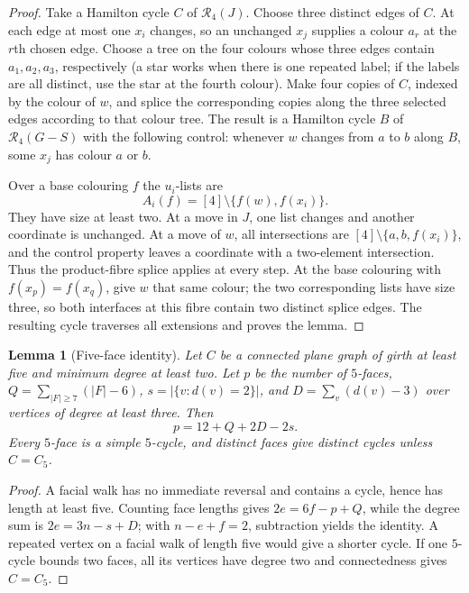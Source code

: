 \documentclass[11pt]{article}
\newtheorem{lemma}[theorem]{Lemma}
\theoremstyle{remark}
\newcommand{\R}{\mathcal R}
\numberwithin{equation}{section}
\numberwithin{table}{section}
\begin{document}
\begin{proof}
Take a Hamilton cycle $C$ of $\R_4(J)$.  Choose three distinct edges of
$C$.  At each edge at most one $x_i$ changes, so an unchanged $x_j$ supplies
a colour $a_r$ at the $r$th chosen edge.  Choose a tree on the four colours
whose three edges contain $a_1,a_2,a_3$, respectively (a star works when
there is one repeated label; if the labels are all distinct, use the star
at the fourth colour).  Make four copies of $C$, indexed by the colour of
$w$, and splice the corresponding copies along the three selected edges
according to that colour tree.  The result is a Hamilton cycle $B$ of
$\R_4(G-S)$ with the following control: whenever $w$ changes from $a$ to $b$
along $B$, some $x_j$ has colour $a$ or $b$.

Over a base colouring $f$ the $u_i$-lists are
\[
 A_i(f)=[4]\setminus\{f(w),f(x_i)\}.
\]
They have size at least two.  At a move in $J$, one list changes and another
coordinate is unchanged.  At a move of $w$, all intersections are
$[4]\setminus\{a,b,f(x_i)\}$, and the control property leaves a coordinate
with a two-element intersection.  Thus the product-fibre splice applies at
every step.  At the base colouring with $f(x_p)=f(x_q)$, give $w$ that same
colour; the two corresponding lists have size three, so both interfaces at
this fibre contain two distinct splice edges.  The resulting cycle traverses
all extensions and proves the lemma.
\end{proof}

\begin{lemma}[Five-face identity]
\label{lem:five-face-identity-subclass}
Let $C$ be a connected plane graph of girth at least five and minimum degree
at least two.  Let $p$ be the number of $5$-faces,
$Q=\sum_{|F|\ge7}(|F|-6)$, $s=|\{v:d(v)=2\}|$, and
$D=\sum_v(d(v)-3)$ over vertices of degree at least three.  Then
\[
 p=12+Q+2D-2s.
\]
Every $5$-face is a simple $5$-cycle, and distinct faces give distinct
cycles unless $C=C_5$.
\end{lemma}

\begin{proof}
A facial walk has no immediate reversal and contains a cycle, hence has
length at least five.  Counting face lengths gives
$2e=6f-p+Q$, while the degree sum is $2e=3n-s+D$; with $n-e+f=2$,
subtraction yields the identity.  A repeated vertex on a facial walk of
length five would give a shorter cycle.  If one $5$-cycle bounds two faces,
all its vertices have degree two and connectedness gives $C=C_5$.
\end{proof}
\end{document}
